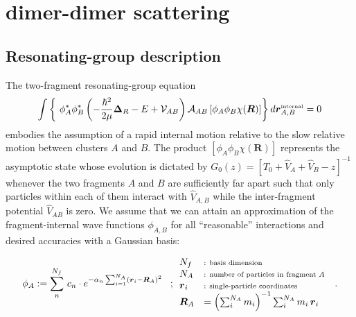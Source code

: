 \documentclass[onecolumn,preprint,superscriptaddress,nofootinbib,notitlepage,10pt,linenumbers]{revtex4-1}
\newcommand{\be}{\begin{equation}}
\newcommand{\ee}{\end{equation}}
\newcommand{\ve}[1]{\ensuremath{\boldsymbol{#1}}}
\begin{document}
\section{dimer-dimer scattering}

\subsection{Resonating-group description}

The two-fragment resonating-group equation
\be\label{eq.rgm.eqom}
\int\left\lbrace~\phi^*_A\phi^*_B\left(-\frac{\hbar^2}{2\mu}\ve{\Delta}_R-E+\mathcal{V}_{AB}\right)
\mathcal{A}_{AB}\left[\phi_A\phi_B\chi(\ve{R})\right]\right\rbrace d\ve{r}^\text{\tiny internal}_{A,B}=0
\ee
embodies the assumption of a rapid internal motion relative to the slow relative motion between
clusters $A$ and $B$.
The product $\left[\phi_A\phi_B\chi(\ve{R})\right]$ represents the asymptotic state whose evolution is
dictated by
$G_0(z)=\left[\hat{T}_0+\hat{V}_A+\hat{V}_B-z\right]^{-1}$
whenever the two fragments $A$ and $B$ are sufficiently far apart such that only particles within each of them
interact with $\hat{V}_{A,B}$ while the inter-fragment potential $\hat{V}_{AB}$ is zero.
We assume that we can attain an approximation of the fragment-internal wave functions $\phi_{A,B}$ for all
``reasonable'' interactions and desired accuracies with a Gaussian basis:

\be\label{eq.rgm.corewfktfull}
\phi_A:=\sum_n^{N_f}\,c_n\cdot e^{-\alpha_n\sum_{i=1}^{N_A}\left(\ve{r}_i-\ve{R}_A\right)^2}\;\;\;;
\begin{array}{ll}
     N_f & \text{\scriptsize : basis dimension}  \\
     N_A & \text{\scriptsize : number of particles in fragment $A$}\\
     \ve{r}_i & \text{\scriptsize : single-particle coordinates}  \\
     \ve{R}_A & =\left(\sum_i^{N_A}m_i\right)^{-1}\sum_i^{N_A}m_i\,\ve{r}_i
\end{array}\;\;.
\ee
\end{document}
